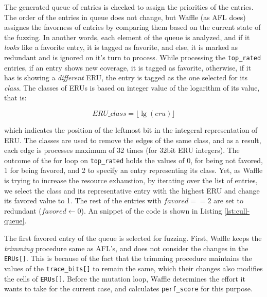 


The generated queue of entries is checked to assign the priorities of the entries. The order of the entries in queue does not change, but Waffle (as AFL does) assignes the favorness of entries by comparing them based on the current state of the fuzzing. In another words, each element of the queue is analyzed, and if it \textit{looks} like a favorite entry, it is tagged as favorite, and else, it is marked as redundant and is ignored on it's turn to process. While processing the \texttt{top\_rated} entries, if an entry shows new coverage, it is tagged as favorite, otherwise, if it has is showing a \textit{different} ERU, the entry is tagged as the one selected for its \textit{class}. The classes of ERUs is based on integer value of the logarithm of its value, that is:

\begin{equation}
  \label{eq:eru-class}
  ERU\_class = \lfloor \lg(eru) \rfloor  
\end{equation}

which indicates the position of the leftmost bit in the integeral representation of ERU. The classes are used to remove the edges of the same class, and as a result, each edge is processes maximum of 32 times (for 32bit ERU integers). The outcome of the for loop on \texttt{top\_rated} holds the values of 0, for being not favored, 1 for being favored, and 2 to specify an entry representing its class. Yet, as Waffle is trying to increase the resource exhaustion, by iterating over the list of entries, we select the class and its representative entry with the highest ERU and change its favored value to 1. The rest of the entries with $favored == 2$ are set to redundant ($ favored \leftarrow 0 $). An snippet of the code is shown in Listing \ref{lst:cull-queue}.




The first favored entry of the queue is selected for fuzzing. First, Waffle keeps the \textit{trimming} procedure same as AFL's, and does not consider the changes in the \texttt{ERUs[]}. This is because of the fact that the trimming procedure maintains the values of the \texttt{trace\_bits[]} to remain the same, which their changes also modifies the cells of \texttt{ERUs[]}. Before the mutation loop, Waffle determines the effort it wants to take for the current case, and calculates \texttt{perf\_score} for this purpose.

